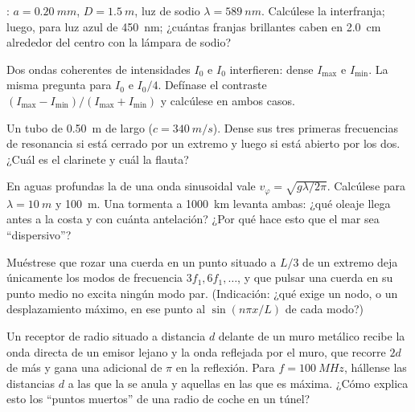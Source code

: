 \begin{exercise}[$\star\star$]\label{exo:b1:wave-propagation:7}
: $a = \qty{0.20}{mm}$, $D = \qty{1.5}{m}$, luz de sodio
$\lambda = \qty{589}{nm}$. Calcúlese la interfranja; luego, para luz azul
de \qty{450}{nm}; ¿cuántas franjas brillantes caben en \qty{2.0}{cm}
alrededor del centro con la lámpara de sodio?
\end{exercise}

\begin{exercise}[$\star\star$]\label{exo:b1:wave-propagation:8}
Dos ondas coherentes de intensidades $I_0$ e $I_0$ interfieren: dense
$I_{\max}$ e $I_{\min}$. La misma pregunta para $I_0$ e $I_0/4$. Defínase
el contraste $(I_{\max} - I_{\min})/(I_{\max} + I_{\min})$ y calcúlese en
ambos casos.
\end{exercise}

\begin{exercise}[$\star\star$]\label{exo:b1:wave-propagation:9}
Un tubo de \qty{0.50}{m} de largo ($c = \qty{340}{m/s}$). Dense sus tres
primeras frecuencias de resonancia si está cerrado por un extremo y luego
si está abierto por los dos. ¿Cuál es el clarinete y cuál la flauta?
\end{exercise}

\begin{exercise}[$\star\star\star$]\label{exo:b1:wave-propagation:10}
En aguas profundas la  de una onda sinusoidal vale
$v_\varphi = \sqrt{g\lambda/2\pi}$. Calcúlese para $\lambda = \qty{10}{m}$
y \qty{100}{m}. Una tormenta a \qty{1000}{km} levanta ambas: ¿qué oleaje
llega antes a la costa y con cuánta antelación? ¿Por qué hace esto que el
mar sea ``dispersivo''?
\end{exercise}

\begin{exercise}[$\star\star\star$]\label{exo:b1:wave-propagation:11}
Muéstrese que rozar una cuerda en un punto situado a $L/3$ de un extremo
deja únicamente los modos de frecuencia $3f_1, 6f_1, \dots$, y que pulsar
una cuerda en su punto medio no excita ningún modo par. (Indicación: ¿qué
exige un nodo, o un desplazamiento máximo, en ese punto al
$\sin(n\pi x/L)$ de cada modo?)
\end{exercise}

\begin{exercise}[$\star\star\star$]\label{exo:b1:wave-propagation:12}
Un receptor de radio situado a distancia $d$ delante de un muro metálico
recibe la onda directa de un emisor lejano y la onda reflejada por el
muro, que recorre $2d$ de más y gana una  adicional de $\pi$ en la
reflexión. Para $f = \qty{100}{MHz}$, hállense las distancias $d$ a las
que la  se anula y aquellas en las que es máxima. ¿Cómo explica esto
los ``puntos muertos'' de una radio de coche en un túnel?
\end{exercise}


